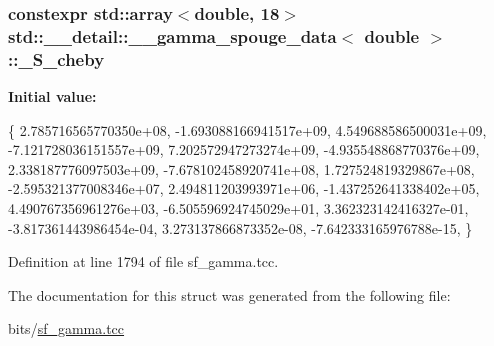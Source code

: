 \subsubsection[{\texorpdfstring{\+\_\+\+S\+\_\+cheby}{_S_cheby}}]{\setlength{\rightskip}{0pt plus 5cm}constexpr std\+::array$<$double, 18$>$ {\bf std\+::\+\_\+\+\_\+detail\+::\+\_\+\+\_\+gamma\+\_\+spouge\+\_\+data}$<$ double $>$\+::\+\_\+\+S\+\_\+cheby\hspace{0.3cm}{\ttfamily [static]}}\hypertarget{structstd_1_1____detail_1_1____gamma__spouge__data_3_01double_01_4_ae7638accff257079573b702a72e01254}{}\label{structstd_1_1____detail_1_1____gamma__spouge__data_3_01double_01_4_ae7638accff257079573b702a72e01254}
{\bfseries Initial value\+:}
\begin{DoxyCode}
\{
     2.785716565770350e+08,
    -1.693088166941517e+09,
     4.549688586500031e+09,
    -7.121728036151557e+09,
     7.202572947273274e+09,
    -4.935548868770376e+09,
     2.338187776097503e+09,
    -7.678102458920741e+08,
     1.727524819329867e+08,
    -2.595321377008346e+07,
     2.494811203993971e+06,
    -1.437252641338402e+05,
     4.490767356961276e+03,
    -6.505596924745029e+01,
     3.362323142416327e-01,
    -3.817361443986454e-04,
     3.273137866873352e-08,
    -7.642333165976788e-15,
      \}
\end{DoxyCode}


Definition at line 1794 of file sf\+\_\+gamma.\+tcc.



The documentation for this struct was generated from the following file\+:\begin{DoxyCompactItemize}
\item 
bits/\hyperlink{sf__gamma_8tcc}{sf\+\_\+gamma.\+tcc}\end{DoxyCompactItemize}
